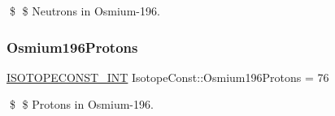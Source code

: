 \$ \$ Neutrons in Osmium-\/196. \mbox{\label{group___isotope_const-_osmium-_os196_gab5f4e233a2db302bd811653d5a327e17}} 
\subsubsection{\texorpdfstring{Osmium196\+Protons}{Osmium196Protons}}
{\footnotesize\ttfamily \mbox{\hyperlink{group___isotope_const-_macros_ga5f18360b3e99483a35c32d789e62621c}{I\+S\+O\+T\+O\+P\+E\+C\+O\+N\+S\+T\+\_\+\+I\+NT}} Isotope\+Const\+::\+Osmium196\+Protons = 76}

\$ \$ Protons in Osmium-\/196. 